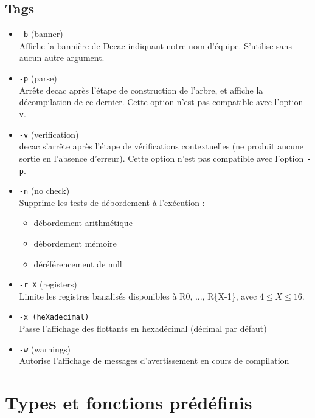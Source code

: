\documentclass[12pt]{article}
\begin{document}
\subsection{Tags}
\begin{itemize}
       \item[] \lstinline!-b! (banner)\\
         Affiche la bannière de Decac indiquant notre nom d'équipe. 
         S'utilise sans aucun autre argument.
       \item[] \lstinline!-p! (parse)\\
         Arrête decac après l'étape de construction de
         l'arbre, et affiche la décompilation de ce dernier.
         Cette option n'est pas compatible avec l'option \lstinline!-v!.
       \item[]\lstinline!-v! (verification)\\
         decac s'arrête après l'étape de vérifications contextuelles 
         (ne produit aucune sortie en l'absence d'erreur).
         Cette option n'est pas compatible avec l'option \lstinline!-p!.
       \item[]\lstinline!-n! (no check)\\
         Supprime les tests de débordement à l'exécution : 
         \begin{itemize}
           \item débordement arithmétique
           \item débordement mémoire
           \item déréférencement de null
         \end{itemize}
       \item[]\lstinline!-r X! (registers)\\
         Limite les registres banalisés disponibles à R0, ..., R\{X-1\}, avec
         $4 \leq X \leq 16$.
       \item[]\lstinline!-x (heXadecimal)!\\
         Passe l'affichage des flottants en hexadécimal (décimal par défaut)
       \item[]\lstinline!-w! (warnings)\\
         Autorise l'affichage de messages d'avertissement en cours de compilation
\end{itemize}

\section{Types et fonctions prédéfinis}
\end{document}
